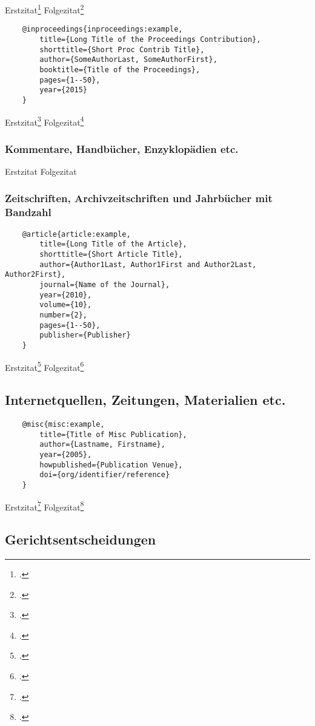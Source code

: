 \documentclass[a4paper]{article}
\begin{document}
Erstzitat\footcite[10]{incollection:example}
Folgezitat\footcite[20]{incollection:example}

\begin{Verbatim}
	@inproceedings{inproceedings:example,
		title={Long Title of the Proceedings Contribution},
		shorttitle={Short Proc Contrib Title},
		author={SomeAuthorLast, SomeAuthorFirst},
		booktitle={Title of the Proceedings},
		pages={1--50},
		year={2015}
	}
\end{Verbatim}

Erstzitat\footcite[10]{inproceedings:example}
Folgezitat\footcite[20]{inproceedings:example}

\subsubsection{Kommentare, Handbücher, Enzyklopädien etc.}

Erstzitat
Folgezitat

\subsubsection{Zeitschriften, Archivzeitschriften und Jahrbücher mit Bandzahl}

\begin{Verbatim}
	@article{article:example,
		title={Long Title of the Article},
		shorttitle={Short Article Title},
		author={Author1Last, Author1First and Author2Last, Author2First},
		journal={Name of the Journal},
		year={2010},
		volume={10},
		number={2},
		pages={1--50},
		publisher={Publisher}
	}
\end{Verbatim}

Erstzitat\footcite[10]{article:example}
Folgezitat\footcite[20]{article:example}

	
\subsection{Internetquellen, Zeitungen, Materialien etc.}

\begin{Verbatim}
	@misc{misc:example,
		title={Title of Misc Publication},
		author={Lastname, Firstname},
		year={2005},
		howpublished={Publication Venue},
		doi={org/identifier/reference}
	}	
\end{Verbatim}

Erstzitat\footcite{misc:example}
Folgezitat\footcite{misc:example}
	
\subsection{Gerichtsentscheidungen}
	
\end{document}
